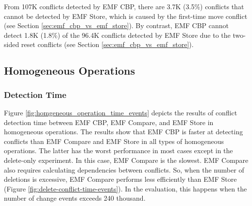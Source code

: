From 107K conflicts detected by EMF CBP, there are 3.7K (3.5\%) conflicts that cannot be detected by EMF Store, which is caused by the first-time move conflict (see Section \ref{sec:emf_cbp_vs_emf_store}). By contrast, EMF CBP cannot detect 1.8K (1.8\%) of the 96.4K conflicts detected by EMF Store due to the two-sided reset conflicts (see Section \ref{sec:emf_cbp_vs_emf_store}). 



%
%
%

\subsection{Homogeneous Operations}
\label{sec:homogeneous-operation_conflict}

\subsubsection{Detection Time} 
\label{sec:detection_time}
Figure \ref{fig:homgeneous_operation_time_events} depicts the results of conflict detection time between EMF CBP, EMF Compare, and EMF Store in homogeneous operations. The results show that EMF CBP is faster at detecting conflicts than EMF Compare and EMF Store in all types of homogeneous operations. The latter has the worst performance in most cases except in the delete-only experiment. In this case, EMF Compare is the slowest. EMF Compare also requires calculating dependencies between conflicts. So, when the number of deletions is excessive, EMF Compare performs less efficiently than EMF Store (Figure \ref{fig:delete-conflict-time-events}). In the evaluation, this happens when the number of change events exceeds 240 thousand.

